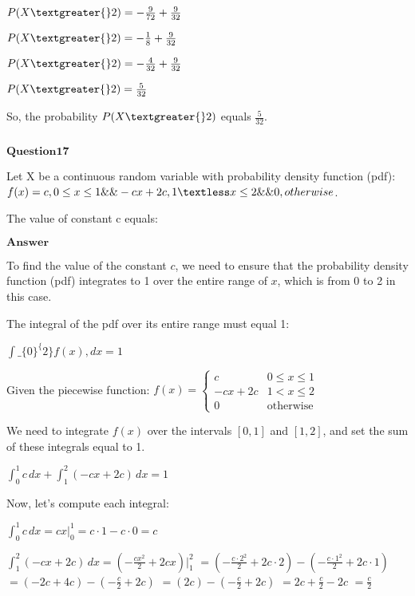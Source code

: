 \documentclass[11pt]{article}
\makeatletter
\newcommand{\boxspacing}{\kern\kvtcb@left@rule\kern\kvtcb@boxsep}
\newcommand{\prompt}[4]{
        {\ttfamily\llap{{\color{#2}[#3]:\hspace{3pt}#4}}\vspace{-\baselineskip}}
    }
\makeatother
\begin{document}
$ P(X \textgreater{} 2) = -\frac{9}{72} + \frac{9}{32} $

$ P(X \textgreater{} 2) = -\frac{1}{8} + \frac{9}{32} $

$ P(X \textgreater{} 2) = -\frac{4}{32} + \frac{9}{32} $

$ P(X \textgreater{} 2) = \frac{5}{32} $

So, the probability $ P(X \textgreater{} 2) $ equals $ \frac{5}{32}
$.

    \begin{tcolorbox}[breakable, size=fbox, boxrule=1pt, pad at break*=1mm,colback=cellbackground, colframe=cellborder]
\prompt{In}{incolor}{ }{\boxspacing}
\begin{Verbatim}[commandchars=\\\{\}]

\end{Verbatim}
\end{tcolorbox}

    $\textbf{Question17}$

Let X be a continuous random variable with probability density function
(pdf): $f(x)=c,0 \leq x \leq 1 \&\& -cx+2c,1\textless x \leq 2 \&\& 0, otherwise$.

The value of constant c equals:

$\textbf{Answer}$

    To find the value of the constant $ c $, we need to ensure that the
probability density function (pdf) integrates to 1 over the entire range
of $ x $, which is from 0 to 2 in this case.

The integral of the pdf over its entire range must equal 1:

$ \int\_\{0\}^\{2\} f(x) , dx = 1 $

Given the piecewise function: $ f(x) =\begin{cases} c & 0 \leq x \leq 1 \\ -cx + 2c & 1 < x \leq 2 \\ 0 & \text{otherwise} \end{cases}$

We need to integrate $ f(x) $ over the intervals $[0,1]$ and
$[1,2]$, and set the sum of these integrals equal to 1.

$ \int_{0}^{1} c \, dx + \int_{1}^{2} (-cx + 2c) \, dx = 1 $

Now, let's compute each integral:

$ \int_{0}^{1} c \, dx = cx \Bigg|_{0}^{1} = c \cdot 1 - c \cdot 0 = c $

$ \int_{1}^{2} (-cx + 2c) \, dx = \left( -\frac{cx^2}{2} + 2cx \right) \Bigg|_{1}^{2} $
$ = \left( -\frac{c \cdot 2^2}{2} + 2c \cdot 2 \right) - \left( -\frac{c \cdot 1^2}{2} + 2c \cdot 1 \right) $
$ = \left( -2c + 4c \right) - \left( -\frac{c}{2} + 2c \right) $
$ = (2c) - (-\frac{c}{2} + 2c) $
$ = 2c + \frac{c}{2} - 2c $
$ = \frac{c}{2} $
\end{document}
